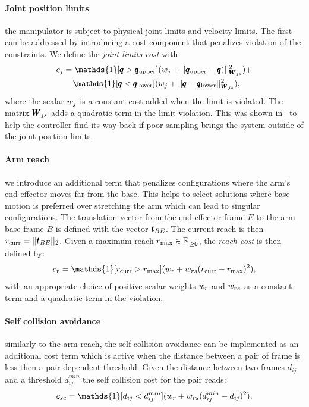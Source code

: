  \paragraph{Joint position limits} the manipulator is subject to physical joint limits and velocity limits. The first can be addressed by introducing a cost component that penalizes violation of the constraints. We define the \textit{joint limits cost} with:
 \begin{align}
     &c_{j} = \mathds{1}[\configRobot > \upperLimits](\weightScalar{j} + ||\upperLimits - \configRobot)||^2_{\weightMatrix{js}}) + \nonumber\\ 
     &\qquad\mathds{1}[\configRobot < \lowerLimits](\weightScalar{j} +  || \configRobot - \lowerLimits||^2_{\weightMatrix{js}}), 
 \end{align}
 where the scalar $w_{j}$ is a constant cost added when the limit is violated. The matrix $\pmb{W}_{js}$ adds a quadratic term in the limit violation. This was shown in~\cite{williams_information-theoretic_2018} to help the controller find its way back if poor sampling brings the system outside of the joint position limits.
 
 \paragraph{Arm reach} we introduce an additional term that penalizes configurations where the arm's end-effector moves far from the base. This helps to select solutions where base motion is preferred over stretching the arm which can lead to singular configurations. The translation vector from the end-effector frame $E$ to the arm base frame $B$ is defined with the vector $\pmb{t}_{BE}$. The current reach is then $r_{\text{curr}} = || \pmb{t}_{BE} ||_2$. Given a maximum reach $r_{\text{max}} \in \mathbb{R}^{}_{\geq 0}$, the \textit{reach cost} is then defined by:
 \begin{equation}
   c_r = \mathds{1}[r_{\text{curr}} > r_{\text{max}}] (\weightScalar{r} + \weightScalar{rs}(r_{\text{curr}} - r_{\text{max}})^2),    
 \end{equation}
 with an appropriate choice of positive scalar weights $w_{r}$ and $w_{rs}$ as a constant term and a quadratic term in the violation.
 
 \paragraph{Self collision avoidance} similarly to the arm reach, the self collision avoidance can be implemented as an additional cost term which is active when the distance between a pair of frame is less then a pair-dependent threshold. Given the distance between two frames $d_{ij}$ and a threshold $d^{min}_{ij}$ the self collision cost for the pair reads:
 \begin{equation}
   c_{sc} = \mathds{1}[d_{ij} < d^{min}_{ij}] (\weightScalar{r} + \weightScalar{rs}(d^{min}_{ij} - d_{ij})^2),    
 \end{equation}
 
